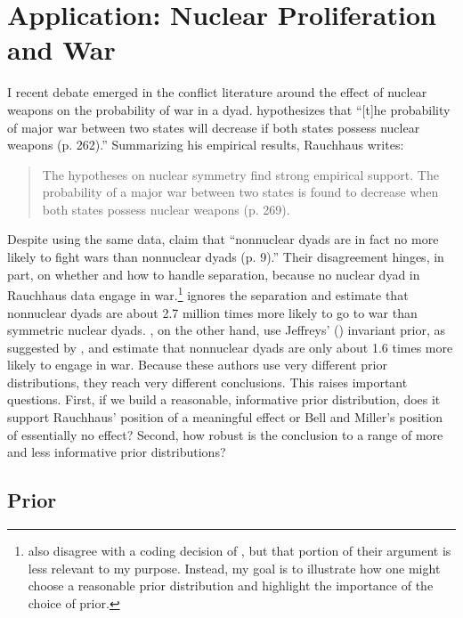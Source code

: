 \documentclass[12pt]{article}
\begin{document}
\section*{Application: Nuclear Proliferation and War}

I recent debate emerged in the conflict literature around the effect of nuclear weapons on the probability of war in a dyad. \cite{Rauchhaus2009} hypothesizes that ``[t]he probability of major war between two states will decrease if both states possess nuclear weapons (p. 262).'' Summarizing his empirical results, Rauchhaus writes:

\begin{quote} 
The hypotheses on nuclear symmetry find strong empirical support. The probability of a major war between two states is found to decrease when both states possess nuclear weapons (p. 269).
\end{quote}

Despite using the same data, \cite{BellMiller2014} claim that ``nonnuclear dyads are in fact no more likely to fight wars than nonnuclear dyads (p. 9).'' Their disagreement hinges, in part, on whether and how to handle separation, because no nuclear dyad in Rauchhaus data engage in war.\footnote{\cite{BellMiller2014} also disagree with a coding decision of \cite{Rauchhaus2009}, but that portion of their argument is less relevant to my purpose. Instead, my goal is to illustrate how one might choose a reasonable prior distribution and highlight the importance of the choice of prior.} \cite{Rauchhaus2009} ignores the separation and estimate that nonnuclear dyads are about 2.7 million times more likely to go to war than symmetric nuclear dyads. \cite{BellMiller2014}, on the other hand, use Jeffreys' (\citeyear{1946}) invariant prior, as suggested by \cite{Zorn2005}, and estimate that nonnuclear dyads are only about 1.6 times more likely to engage in war. Because these authors use very different prior distributions, they reach very different conclusions. This raises important questions. First, if we build a reasonable, informative prior distribution, does it support Rauchhaus' position of a meaningful effect or Bell and Miller's position of essentially no effect? Second, how robust is the conclusion to a range of more and less informative prior distributions?

\subsection*{Prior}
\end{document}

